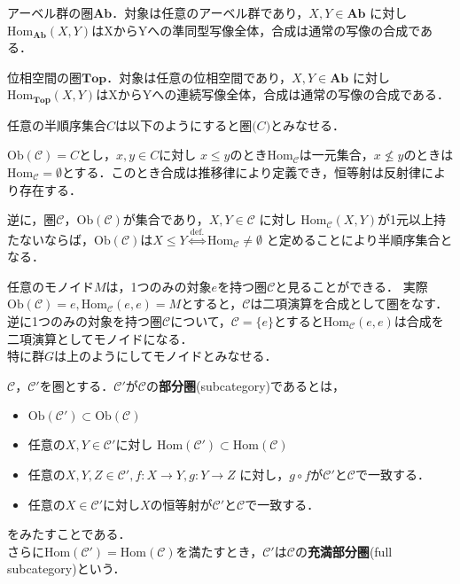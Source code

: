 \begin{ex}
アーベル群の圏$\mathbf{Ab}$．対象は任意のアーベル群であり，$X,Y \in \mathbf{Ab}$ に対し$\mathrm{Hom}_\mathbf{Ab}(X,Y)$はXからYへの準同型写像全体，合成は通常の写像の合成である．
\end{ex} \proofend

\begin{ex}
位相空間の圏$\mathbf{Top}$．対象は任意の位相空間であり，$X,Y \in \mathbf{Ab}$ に対し$\mathrm{Hom}_\mathbf{Top}(X,Y)$はXからYへの連続写像全体，合成は通常の写像の合成である．
\end{ex} \proofend

\begin{ex}
任意の半順序集合$C$は以下のようにすると圏$\mathcal(C)$とみなせる．

$\mathrm{Ob}(\mathcal{C}) = C$とし，$x, y \in C$に対し $x \leq y$のとき$\mathrm{Hom}_\mathcal{C}$は一元集合，$x \nleq y$のときは
$\mathrm{Hom}_\mathcal{C} = \emptyset$とする．このとき合成は推移律により定義でき，恒等射は反射律により存在する．

逆に，圏$\mathcal{C}$，$\mathrm{Ob}(\mathcal{C})$が集合であり，$X,Y \in \mathcal{C}$ に対し $\mathrm{Hom}_\mathcal{C}(X,Y)$が1元以上持たないならば，$\mathrm{Ob}(\mathcal{C})$は$X \leq Y \stackrel{\mathrm{def.}}{\Leftrightarrow} \mathrm{Hom}_\mathcal{C} \neq\emptyset$ と定めることにより半順序集合となる．
\end{ex} \proofend

\begin{ex}
任意のモノイド$M$は，1つのみの対象$e$を持つ圏$\mathcal{C}$と見ることができる．
実際$\mathrm{Ob}(\mathcal{C}) = {e},\mathrm{Hom}_{\mathcal{C}}(e,e) = M$とすると，$\mathcal{C}$は二項演算を合成として圏をなす．逆に1つのみの対象を持つ圏$\mathcal{C}$について，$\mathcal{C} = \{e\}$とすると$\mathrm{Hom}_{\mathcal{C}}(e,e)$は合成を二項演算としてモノイドになる．\\
特に群$G$は上のようにしてモノイドとみなせる．
\end{ex} \proofend

\begin{defi}
$\mathcal{C}，\mathcal{C'}$を圏とする．$\mathcal{C'}が\mathcal{C}$の{\bf 部分圏}(subcategory)であるとは，
\begin{itemize}
\item $\mathrm{Ob}(\mathcal{C'}) \subset \mathrm{Ob}(\mathcal{C})$
\item 任意の$X,Y \in \mathcal{C'}$に対し $ \mathrm{Hom}(\mathcal{C'}) \subset \mathrm{Hom}(\mathcal{C})$
\item 任意の$X,Y, Z \in \mathcal{C'}, f:X \to Y , g:Y \to Z$ に対し，$g \circ f$が$\mathcal{C'}$と$\mathcal{C}$で一致する．
\item 任意の$X \in \mathcal{C'}$に対し$X$の恒等射が$\mathcal{C'}$と$\mathcal{C}$で一致する．
\end{itemize}
をみたすことである．\\
さらに$ \mathrm{Hom}(\mathcal{C'}) = \mathrm{Hom}(\mathcal{C})$を満たすとき，$\mathcal{C'}$は$\mathcal{C}$の{\bf 充満部分圏}(full subcategory)という．
\end{defi} \proofend

